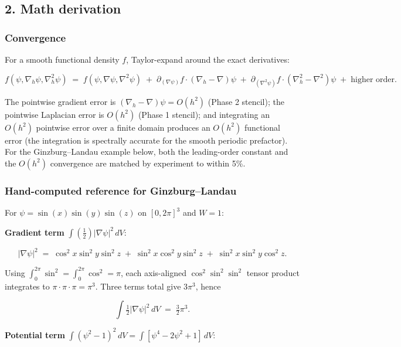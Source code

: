 \subsection{2. Math derivation}\label{math-derivation}

\subsubsection{Convergence}\label{convergence}

For a smooth functional density \(f\), Taylor-expand around the exact
derivatives:

\[
f(\psi, \nabla_h\psi, \nabla^2_h\psi) \;=\; f(\psi, \nabla\psi, \nabla^2\psi) \;+\; \partial_{(\nabla\psi)} f \cdot (\nabla_h - \nabla)\psi \;+\; \partial_{(\nabla^2\psi)} f \cdot (\nabla^2_h - \nabla^2)\psi \;+\; \text{higher order}.
\]

The pointwise gradient error is \((\nabla_h - \nabla)\psi = O(h^2)\)
(Phase 2 stencil); the pointwise Laplacian error is \(O(h^2)\) (Phase 1
stencil); and integrating an \(O(h^2)\) pointwise error over a finite
domain produces an \(O(h^2)\) functional error (the integration is
spectrally accurate for the smooth periodic prefactor). For the
Ginzburg--Landau example below, both the leading-order constant and the
\(O(h^2)\) convergence are matched by experiment to within 5\%.

\subsubsection{Hand-computed reference for
Ginzburg--Landau}\label{hand-computed-reference-for-ginzburglandau}

For \(\psi = \sin(x)\sin(y)\sin(z)\) on \([0, 2\pi]^3\) and \(W = 1\):

\textbf{Gradient term} \(\int (\tfrac{1}{2})|\nabla\psi|^2\, dV\):

\[
|\nabla\psi|^2 \;=\; \cos^2 x \sin^2 y \sin^2 z \;+\; \sin^2 x \cos^2 y \sin^2 z \;+\; \sin^2 x \sin^2 y \cos^2 z.
\]

Using \(\int_0^{2\pi}\sin^2 = \int_0^{2\pi}\cos^2 = \pi\), each
axis-aligned \(\cos^2\sin^2\sin^2\) tensor product integrates to
\(\pi \cdot \pi \cdot \pi = \pi^3\). Three terms total give \(3\pi^3\),
hence

\[
\int \tfrac{1}{2}|\nabla\psi|^2\, dV \;=\; \tfrac{3}{2}\pi^3.
\]

\textbf{Potential term}
\(\int (\psi^2 - 1)^2\, dV = \int [\psi^4 - 2\psi^2 + 1]\, dV\):

